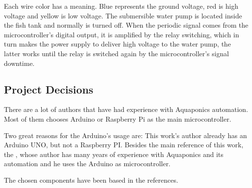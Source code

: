 Each wire color has a meaning.
Blue represents the ground voltage,
red is high voltage
and yellow is low voltage.
The submersible water pump is located inside the fish tank and normally is turned off.
When the periodic signal comes from the microcontroller's digital output,
it is amplified by the relay switching,
which in turn makes the power supply to deliver high voltage to the water pump,
the latter works until the relay is switched again by the microcontroller's signal downtime.

\subsection{Project Decisions}
There are a lot of authors \cite{GoddekDelaideMankasinghEtAl2015} \cite{clark2009system} \cite{Leatherbury2014} that have had experience with Aquaponics automation.
Most of them chooses Arduino or Raspberry Pi as the main microcontroller.

Two great reasons for the Arduino's usage are:
This work's author already has an Arduino UNO,
but not a Raspberry PI.
Besides the main reference of this work,
the \cite{Kretzinger2015},
whose author has many years of experience with Aquaponics and its automation and he uses the Arduino as microcontroller.

The chosen components have been based in the references.
